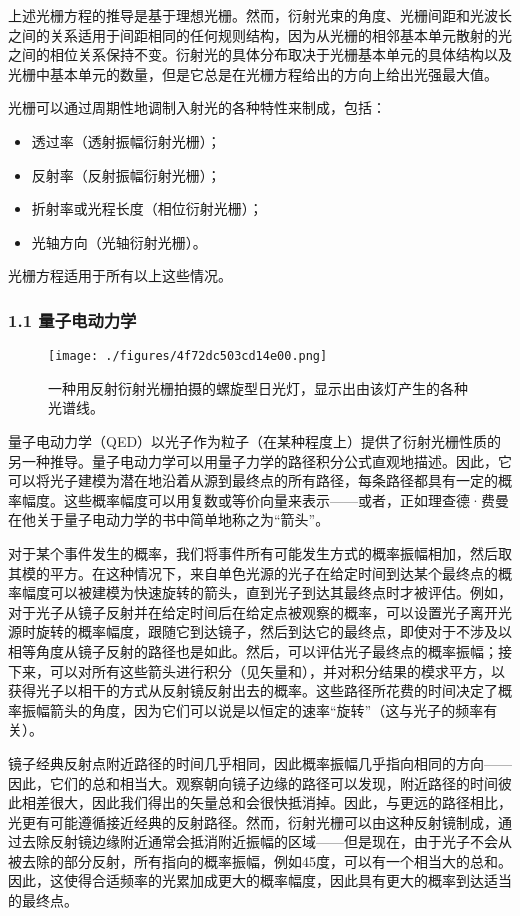 上述光栅方程的推导是基于理想光栅。然而，衍射光束的角度、光栅间距和光波长之间的关系适用于间距相同的任何规则结构，因为从光栅的相邻基本单元散射的光之间的相位关系保持不变。衍射光的具体分布取决于光栅基本单元的具体结构以及光栅中基本单元的数量，但是它总是在光栅方程给出的方向上给出光强最大值。

光栅可以通过周期性地调制入射光的各种特性来制成，包括：

\begin{itemize}
\item 透过率（透射振幅衍射光栅）；
\item 反射率（反射振幅衍射光栅）；
\item 折射率或光程长度（相位衍射光栅）；
\item 光轴方向（光轴衍射光栅）。
\end{itemize}

光栅方程适用于所有以上这些情况。

\subsubsection{1.1 量子电动力学}
\begin{figure}[ht]
\centering
\texttt{[image: ./figures/4f72dc503cd14e00.png]}
\caption{一种用反射衍射光栅拍摄的螺旋型日光灯，显示出由该灯产生的各种光谱线。} \label{fig_YSGS_4}
\end{figure}
量子电动力学（QED）以光子作为粒子（在某种程度上）提供了衍射光栅性质的另一种推导。量子电动力学可以用量子力学的路径积分公式直观地描述。因此，它可以将光子建模为潜在地沿着从源到最终点的所有路径，每条路径都具有一定的概率幅度。这些概率幅度可以用复数或等价向量来表示——或者，正如理查德·费曼在他关于量子电动力学的书中简单地称之为“箭头”。

对于某个事件发生的概率，我们将事件所有可能发生方式的概率振幅相加，然后取其模的平方。在这种情况下，来自单色光源的光子在给定时间到达某个最终点的概率幅度可以被建模为快速旋转的箭头，直到光子到达其最终点时才被评估。例如，对于光子从镜子反射并在给定时间后在给定点被观察的概率，可以设置光子离开光源时旋转的概率幅度，跟随它到达镜子，然后到达它的最终点，即使对于不涉及以相等角度从镜子反射的路径也是如此。然后，可以评估光子最终点的概率振幅；接下来，可以对所有这些箭头进行积分（见矢量和），并对积分结果的模求平方，以获得光子以相干的方式从反射镜反射出去的概率。这些路径所花费的时间决定了概率振幅箭头的角度，因为它们可以说是以恒定的速率“旋转”（这与光子的频率有关）。

镜子经典反射点附近路径的时间几乎相同，因此概率振幅几乎指向相同的方向——因此，它们的总和相当大。观察朝向镜子边缘的路径可以发现，附近路径的时间彼此相差很大，因此我们得出的矢量总和会很快抵消掉。因此，与更远的路径相比，光更有可能遵循接近经典的反射路径。然而，衍射光栅可以由这种反射镜制成，通过去除反射镜边缘附近通常会抵消附近振幅的区域——但是现在，由于光子不会从被去除的部分反射，所有指向的概率振幅，例如45度，可以有一个相当大的总和。因此，这使得合适频率的光累加成更大的概率幅度，因此具有更大的概率到达适当的最终点。


